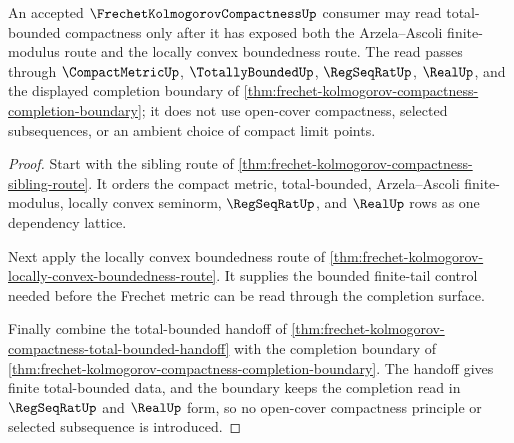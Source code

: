 \begin{theorem}
\label{thm:frechet-kolmogorov-compactness-bounded-tail}
An accepted $\FrechetKolmogorovCompactnessUp$ consumer may read total-bounded compactness only after it has exposed both the Arzela--Ascoli finite-modulus route and the locally convex boundedness route. The read passes through $\CompactMetricUp$, $\TotallyBoundedUp$, $\RegSeqRatUp$, $\RealUp$, and the displayed completion boundary of \autoref{thm:frechet-kolmogorov-compactness-completion-boundary}; it does not use open-cover compactness, selected subsequences, or an ambient choice of compact limit points.
\end{theorem}
\begin{proof}
Start with the sibling route of \autoref{thm:frechet-kolmogorov-compactness-sibling-route}. It orders the compact metric, total-bounded, Arzela--Ascoli finite-modulus, locally convex seminorm, $\RegSeqRatUp$, and $\RealUp$ rows as one dependency lattice.

Next apply the locally convex boundedness route of \autoref{thm:frechet-kolmogorov-locally-convex-boundedness-route}. It supplies the bounded finite-tail control needed before the Frechet metric can be read through the completion surface.

Finally combine the total-bounded handoff of \autoref{thm:frechet-kolmogorov-compactness-total-bounded-handoff} with the completion boundary of \autoref{thm:frechet-kolmogorov-compactness-completion-boundary}. The handoff gives finite total-bounded data, and the boundary keeps the completion read in $\RegSeqRatUp$ and $\RealUp$ form, so no open-cover compactness principle or selected subsequence is introduced.
\end{proof}
